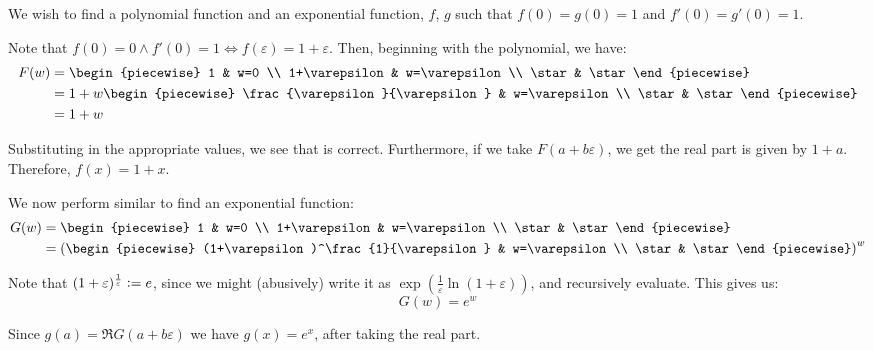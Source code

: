 \begin{example}
    We wish to find a polynomial function and an exponential function, $f$, $g$ such that $f(0)=g(0)=1$ and $f'(0)=g'(0)=1$.

    Note that $f(0)=0\land f'(0)=1\iff f(\varepsilon)=1+\varepsilon$. Then, beginning with the polynomial, we have:
    \begin{align*}
        F(w) &= \begin{piecewise}
            1 & w=0 \\
            1+\varepsilon & w=\varepsilon \\
            \star & \star
        \end{piecewise} \\
        &= 1+w\begin{piecewise}
            \frac{\varepsilon}{\varepsilon} & w=\varepsilon \\
            \star & \star
        \end{piecewise} \\
        &= 1+w
    \end{align*}

    Substituting in the appropriate values, we see that is correct. Furthermore, if we take $F(a+b\varepsilon)$, we get the real part is given by $1+a$. Therefore, $f(x)=1+x$.

    We now perform similar to find an exponential function:
    \begin{align*}
        G(w) &= \begin{piecewise}
            1 & w=0 \\
            1+\varepsilon & w=\varepsilon \\
            \star & \star
        \end{piecewise} \\
        &= \paren*{\begin{piecewise}
            (1+\varepsilon)^\frac{1}{\varepsilon} & w=\varepsilon \\
            \star & \star
        \end{piecewise}}^w \\
    \end{align*}

    Note that $(1+\varepsilon)^\frac{1}{\varepsilon}\vcentcolon= e$, since we might (abusively) write it as $\exp(\frac{1}{\varepsilon}\ln(1+\varepsilon))$, and recursively evaluate. This gives us:
    $$
        G(w)=e^w
    $$

    Since $g(a)=\Re{G(a+b\varepsilon)}$ we have $g(x)=e^x$, after taking the real part.
\end{example}

